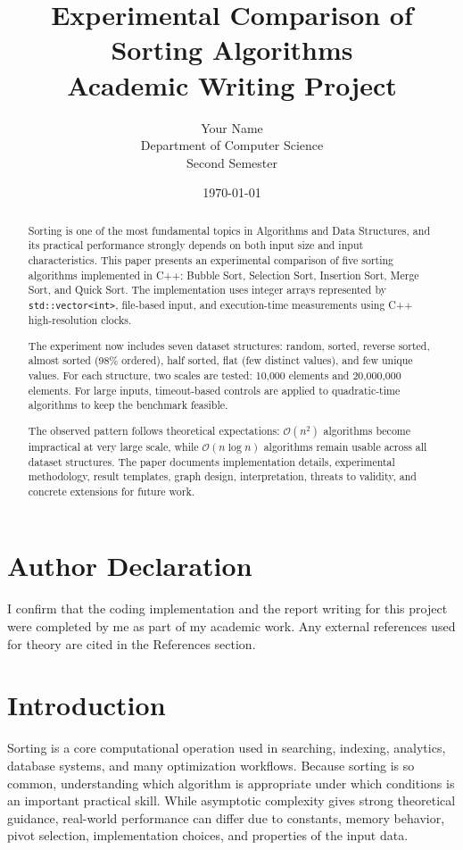 \documentclass[12pt,a4paper]{article}
\title{\textbf{Experimental Comparison of Sorting Algorithms}\\
\large Academic Writing Project}
\author{Your Name\\
Department of Computer Science\\
Second Semester}
\date{\today}
\begin{document}
\maketitle

\section*{Author Declaration}
I confirm that the coding implementation and the report writing for this project were completed by me as part of my academic work. Any external references used for theory are cited in the References section.

\begin{abstract}
Sorting is one of the most fundamental topics in Algorithms and Data Structures, and its practical performance strongly depends on both input size and input characteristics. This paper presents an experimental comparison of five sorting algorithms implemented in C++: Bubble Sort, Selection Sort, Insertion Sort, Merge Sort, and Quick Sort. The implementation uses integer arrays represented by \texttt{std::vector<int>}, file-based input, and execution-time measurements using C++ high-resolution clocks.

The experiment now includes seven dataset structures: random, sorted, reverse sorted, almost sorted (98\% ordered), half sorted, flat (few distinct values), and few unique values. For each structure, two scales are tested: 10,000 elements and 20,000,000 elements. For large inputs, timeout-based controls are applied to quadratic-time algorithms to keep the benchmark feasible.

The observed pattern follows theoretical expectations: $\mathcal{O}(n^2)$ algorithms become impractical at very large scale, while $\mathcal{O}(n\log n)$ algorithms remain usable across all dataset structures. The paper documents implementation details, experimental methodology, result templates, graph design, interpretation, threats to validity, and concrete extensions for future work.
\end{abstract}

\section{Introduction}
Sorting is a core computational operation used in searching, indexing, analytics, database systems, and many optimization workflows. Because sorting is so common, understanding which algorithm is appropriate under which conditions is an important practical skill. While asymptotic complexity gives strong theoretical guidance, real-world performance can differ due to constants, memory behavior, pivot selection, implementation choices, and properties of the input data.
\end{document}
